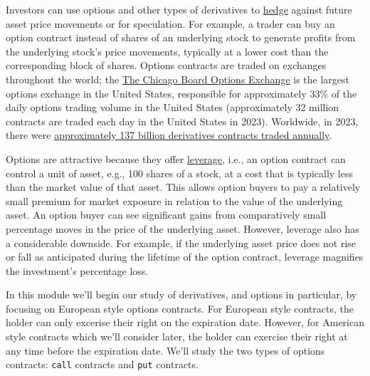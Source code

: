 \documentclass[11pt]{article}
\theoremstyle{definition}
\begin{document}
Investors can use options and other types of derivatives to \href{https://www.investopedia.com/terms/h/hedge.asp}{hedge} against future asset price movements or for speculation. 
For example, a trader can buy an option contract instead of shares of an underlying stock to generate profits from the underlying stock's price movements, 
typically at a lower cost than the corresponding block of shares. Options contracts are traded on exchanges throughout the world; 
the \href{https://www.cboe.com}{The Chicago Board Options Exchange} is the largest options exchange in the United States, 
responsible for approximately 33\% of the daily options trading volume in the United States (approximately 32 million contracts are traded each day in the United States in 2023). 
Worldwide, in 2023, there were \href{https://www.fia.org/fia/articles/global-futures-and-options-volume-hits-record-137-billion-contracts-2023}{approximately 137 billion derivatives contracts traded annually}.

Options are attractive because they offer \href{https://www.merrilledge.com/investment-products/options/options-trading-leverage-risk}{leverage}, 
i.e., an option contract can control a unit of asset, e.g., 100 shares of a stock, 
at a cost that is typically less than the market value of that asset. 
This allows option buyers to pay a relatively small premium for market exposure in relation to the value of the underlying asset. 
An option buyer can see significant gains from comparatively small percentage moves in the price of the underlying asset. 
However, leverage also has a considerable downside. 
For example, if the underlying asset price does not rise or fall as anticipated during the lifetime of the option contract, 
leverage magnifies the investment's percentage loss.

In this module we'll begin our study of derivatives, and options in particular, by focusing on European style options contracts.
For European style contracts, the holder can only excerise their right on the expiration date.
However, for American style contracts which we'll consider later, the holder can exercise their right at any time before the expiration date.
We'll study the two types of options contracts: \texttt{call} contracts and \texttt{put} contracts. 

\end{document}
